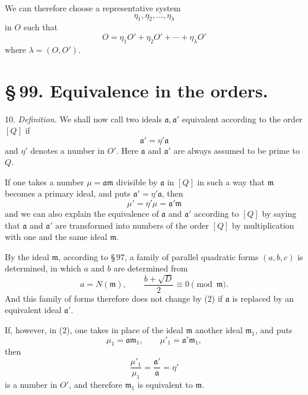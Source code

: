 \documentclass[11pt]{article}
\begin{document}
We can therefore choose a representative system
\[
 \eta_1,\eta_2,\ldots,\eta_\lambda
\]
in $O$ such that
\begin{equation}
 O=\eta_1O'+\eta_2O'+\cdots+\eta_\lambda O'
\tag{11}
\end{equation}
where $\lambda=(O,O')$.

\section*{\S\,99. Equivalence in the orders.}

10. \emph{Definition.} We shall now call two ideals $\mathfrak a,\mathfrak a'$ equivalent according to the order $[Q]$ if
\begin{equation}
 \mathfrak a'=\eta'\mathfrak a
\tag{1}
\end{equation}
and $\eta'$ denotes a number in $O'$. Here $\mathfrak a$ and $\mathfrak a'$ are always assumed to be prime to $Q$.

If one takes a number $\mu=\mathfrak a\mathfrak m$ divisible by $\mathfrak a$ in $[Q]$ in such a way that $\mathfrak m$ becomes a primary ideal, and puts $\mathfrak a'=\eta'\mathfrak a$, then
\begin{equation}
 \mu'=\eta'\mu=\mathfrak a'\mathfrak m
\tag{2}
\end{equation}
and we can also explain the equivalence of $\mathfrak a$ and $\mathfrak a'$ according to $[Q]$ by saying that $\mathfrak a$ and $\mathfrak a'$ are transformed into numbers of the order $[Q]$ by multiplication with one and the same ideal $\mathfrak m$.

By the ideal $\mathfrak m$, according to \S\,97, a family of parallel quadratic forms $(a,b,c)$ is determined, in which $a$ and $b$ are determined from
\begin{equation}
 a=N(\mathfrak m),\qquad
 \frac{b+\sqrt D}{2}\equiv0\pmod{\mathfrak m}.
\tag{3}
\end{equation}
And this family of forms therefore does not change by (2) if $\mathfrak a$ is replaced by an equivalent ideal $\mathfrak a'$.

If, however, in (2), one takes in place of the ideal $\mathfrak m$ another ideal $\mathfrak m_1$, and puts
\begin{equation}
 \mu_1=\mathfrak a\mathfrak m_1,\qquad
 \mu'_1=\mathfrak a'\mathfrak m_1,
\tag{4}
\end{equation}
then
\[
 \frac{\mu'_1}{\mu_1}=\frac{\mathfrak a'}{\mathfrak a}=\eta'
\]
is a number in $O'$, and therefore $\mathfrak m_1$ is equivalent to $\mathfrak m$.
\end{document}

